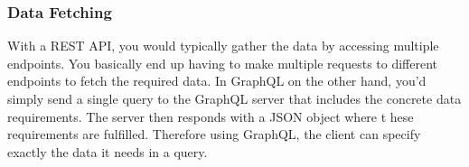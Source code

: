   \subsubsection{Data Fetching}
  With a REST API, you would typically gather the data by accessing multiple endpoints. You basically 
  end up having to make multiple requests to different endpoints to fetch the required data.
  In GraphQL on the other hand, you’d simply send a single query to the GraphQL server that 
  includes the concrete data requirements. The server then responds with a JSON object where t
  hese requirements are fulfilled. Therefore using GraphQL, the client can specify exactly the data 
  it needs in a query.
   




   
  
   


 


